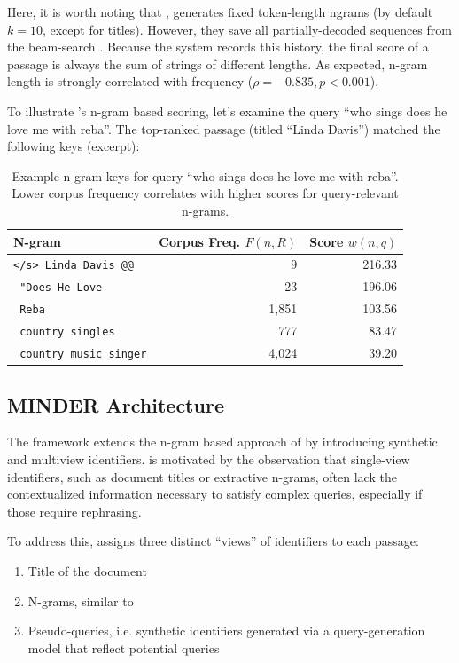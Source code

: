 Here, it is worth noting that , generates fixed token-length ngrams (by default $k=10$, except for titles). However, they save all partially-decoded sequences from the beam-search \cite{michele-bevilacqua-autoregressive-search}. Because the system records this history, the final score of a passage is always the sum of strings of different lengths. As expected, n-gram length is strongly correlated with frequency ($\rho=-0.835, p<0.001$).

To illustrate 's n-gram based scoring, let's examine the query ``who sings does he love me with reba''. The top-ranked passage (titled ``Linda Davis'') matched the following keys (excerpt):

\begin{table}[htbp]
    \centering
    \small
    \begin{tabular}{lrr}
        \toprule
        \textbf{N-gram} & \textbf{Corpus Freq. $F(n,R)$} & \textbf{Score $w(n,q)$} \\
        \midrule
        \texttt{</s> Linda Davis @@} & 9 & 216.33 \\
        \texttt{ "Does He Love} & 23 & 196.06 \\
        \texttt{ Reba} & 1,851 & 103.56 \\
        \texttt{ country singles} & 777 & 83.47 \\
        \texttt{ country music singer} & 4,024 & 39.20 \\
        \bottomrule
    \end{tabular}
    \caption{Example n-gram keys for query ``who sings does he love me with reba''. Lower corpus frequency correlates with higher scores for query-relevant n-grams.}
    \label{tab:ngram-example}
\end{table}

\subsection{MINDER Architecture}
\label{sec:minderarch}
The  framework \cite{yongqi-li-multiview-identifiers} extends the n-gram based approach of  by introducing synthetic and multiview identifiers.  is motivated by the observation that single-view identifiers, such as document titles or extractive n-grams, often lack the contextualized information necessary to satisfy complex queries, especially if those require rephrasing.

To address this,  assigns three distinct ``views'' of identifiers to each passage:
\begin{enumerate}
     \item Title of the document
     \item N-grams, similar to 
     \item Pseudo-queries, i.e. synthetic identifiers generated via a query-generation model that reflect potential queries
\end{enumerate}

